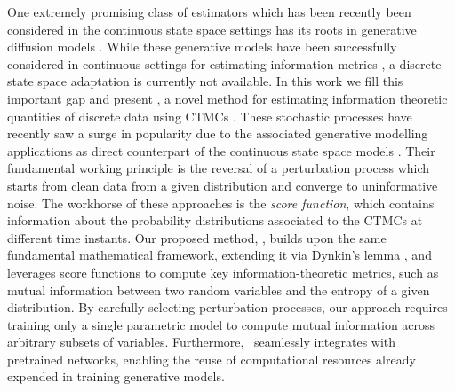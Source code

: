 One extremely promising class of estimators which has been recently been considered in the continuous state space settings has its roots in generative diffusion models \cite{song2021a,ho2020}. While these generative models have been successfully considered in continuous settings for estimating information metrics \citep{franzese2023minde,kong2023information,bounouas}, a discrete state space adaptation is currently not available. In this work we fill this important gap and present \infosedd, a novel method for estimating information theoretic quantities of discrete data using \glspl{CTMC} \citep{lou2024discrete}. These stochastic processes have recently saw a surge in popularity due to the associated generative modelling applications as direct counterpart of the continuous state space models \cite{song2021a,ho2020}. Their fundamental working principle is the reversal of a perturbation process which starts from clean data from a given distribution and converge to uninformative noise. The workhorse of these approaches is the \textit{score function}, which contains information about the probability distributions associated to the \glspl{CTMC} at different time instants. Our proposed method, \infosedd, builds upon the same fundamental mathematical framework, extending it via Dynkin's lemma \citep{hanson2007applied}, and leverages score functions to compute key information-theoretic metrics, such as mutual information between two random variables and the entropy of a given distribution. By carefully selecting perturbation processes, our approach requires training only a single parametric model to compute mutual information across arbitrary subsets of variables. Furthermore, \infosedd\ seamlessly integrates with pretrained networks, enabling the reuse of computational resources already expended in training generative models. 

